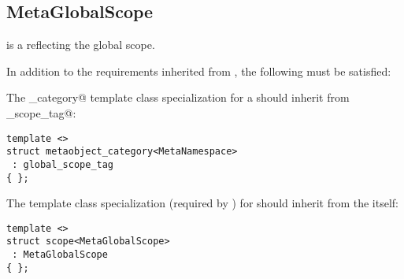 \subsection{MetaGlobalScope}
\label{concept-MetaGlobalScope}

 is a  reflecting the global scope.

In addition to the requirements inherited from , the following must
be satisfied:

The \verb@metaobject_category@ template class specialization for a  should
inherit from \verb@global_scope_tag@:

\begin{verbatim}
template <>
struct metaobject_category<MetaNamespace>
 : global_scope_tag
{ };
\end{verbatim}

The \verb@scope@ template class specialization (required by ) for 
should inherit from the  itself:

\begin{verbatim}
template <>
struct scope<MetaGlobalScope>
 : MetaGlobalScope
{ };
\end{verbatim}

